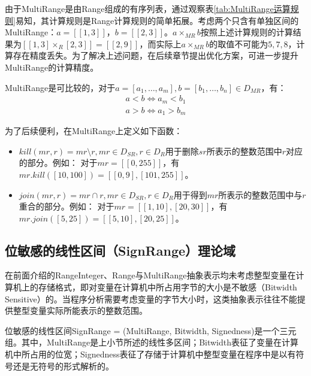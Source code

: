 由于MultiRange是由Range组成的有序列表，通过观察表\ref{tab:MultiRange运算规则}易知，其计算规则是Range计算规则的简单拓展。考虑两个只含有单独区间的MultiRange：$ a = [[1, 3]]$，$ b = [[2, 3]] $。$ a \times_{MR} b $按照上述计算规则的计算结果为$ [[1, 3] \times_R [2, 3]]  = [[2, 9]] $，而实际上$ a \times_{MR} b $的取值不可能为$ 5, 7, 8 $，计算存在精度丢失。为了解决上述问题，在后续章节提出优化方案，可进一步提升MultiRange的计算精度。

MultiRange是可比较的，对于$ a = [a_1, \dots, a_m], b = [b_1, \dots, b_n] \in D_{MR}$，有：
\begin{align}
	a < b \iff a_m < b_1\\
	a > b \iff a_1 > b_m
\end{align}

为了后续便利，在MultiRange上定义如下函数：
\begin{itemize}
	\item $ kill(mr, r) = mr \setminus r, mr \in D_{SR}, r \in D_R$用于删除$ sr $所表示的整数范围中$ r $对应的部分。例如：
	对于$ mr = [[0, 255]] $，有$ mr.kill([10, 100]) = [[0, 9],  [101, 255]] $。
	
	\item $ join(mr, r) = mr \cap r, mr \in D_{SR}, r \in D_R $用于得到$ mr $所表示的整数范围中与$ r $重合的部分。例如：
	对于$ mr = [[1, 10], [20, 30]] $，有$ mr.join([5, 25]) = [[5, 10], [20, 25]] $。
\end{itemize}

\subsection{位敏感的线性区间（SignRange）理论域}
\label{sec:SignRange}

在前面介绍的RangeInteger、Range与MultiRange抽象表示均未考虑整型变量在计算机上的存储格式，即对变量在计算机中所占用字节的大小是不敏感（Bitwidth Sensitive）的。当程序分析需要考虑变量的字节大小时，这类抽象表示往往不能提供整型变量实际所能表示的整数范围。

位敏感的线性区间SignRange = (MultiRange, Bitwidth, Signedness)是一个三元组。其中，MultiRange是上小节所述的线性多区间；Bitwidth表征了变量在计算机中所占用的位宽；Signedness表征了存储于计算机中整型变量在程序中是以有符号还是无符号的形式解析的。

